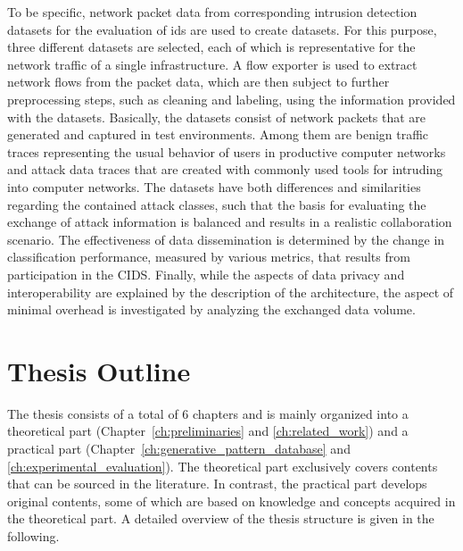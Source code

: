 \documentclass[../../main.tex]{subfiles}
\begin{document}
To be specific, network packet data from corresponding intrusion detection datasets for the evaluation of \gls{ids} are used to create datasets. For this purpose, three different datasets are selected, each of which is representative for the network traffic of a single infrastructure. A flow exporter is used to extract network flows from the packet data, which are then subject to further preprocessing steps, such as cleaning and labeling, using the information provided with the datasets.
Basically, the datasets consist of network packets that are generated and captured in test environments. Among them are benign traffic traces representing the usual behavior of users in productive computer networks and attack data traces that are created with commonly used tools for intruding into computer networks. The datasets have both differences and similarities regarding the contained attack classes, such that the basis for evaluating the exchange of attack information is balanced and results in a realistic collaboration scenario. The effectiveness of data dissemination is determined by the change in classification performance, measured by various metrics, that results from participation in the CIDS. Finally, while the aspects of data privacy and interoperability are explained by the description of the architecture, the aspect of minimal overhead is investigated by analyzing the exchanged data volume.

\section{Thesis Outline}\label{sec:outline}

The thesis consists of a total of 6 chapters and is mainly organized into a theoretical part (Chapter~\ref{ch:preliminaries} and \ref{ch:related_work}) and a practical part (Chapter~\ref{ch:generative_pattern_database} and \ref{ch:experimental_evaluation}). The theoretical part exclusively covers contents that can be sourced in the literature. In contrast, the practical part develops original contents, some of which are based on knowledge and concepts acquired in the theoretical part. A detailed overview of the thesis structure is given in the following.
\end{document}
